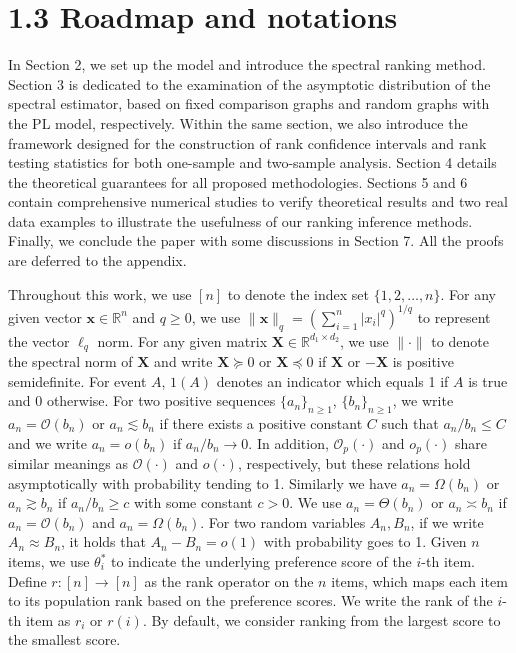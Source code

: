 \section{1.3 Roadmap and notations}\label{roadmap-and-notations}

In Section 2, we set up the model and introduce the spectral ranking method. Section 3 is dedicated to the examination of the asymptotic distribution of the spectral estimator, based on fixed comparison graphs and random graphs with the PL model, respectively. Within the same section, we also introduce the framework designed for the construction of rank confidence intervals and rank testing statistics for both one-sample and two-sample analysis. Section 4 details the theoretical guarantees for all proposed methodologies. Sections 5 and 6 contain comprehensive numerical studies to verify theoretical results and two real data examples to illustrate the usefulness of our ranking inference methods. Finally, we conclude the paper with some discussions in Section 7. All the proofs are deferred to the appendix.

Throughout this work, we use \([n]\) to denote the index set \(\{1,2,\dots ,n\}\). For any given vector \(\mathbf{x} \in \mathbb{R}^n\) and \(q \geq 0\), we use \(\| \mathbf{x}\| _q = (\sum_{i = 1}^{n} |x_i|^q)^{1 / q}\) to represent the vector \(\ell_q\) norm. For any given matrix \(\mathbf{X} \in \mathbb{R}^{d_1 \times d_2}\), we use \(\| \cdot \|\) to denote the spectral norm of \(\mathbf{X}\) and write \(\mathbf{X} \succcurlyeq 0\) or \(\mathbf{X} \preccurlyeq 0\) if \(\mathbf{X}\) or \(- \mathbf{X}\) is positive semidefinite. For event \(A\), \(1(A)\) denotes an indicator which equals 1 if \(A\) is true and 0 otherwise. For two positive sequences \(\{a_n\}_{n \geq 1}\), \(\{b_n\}_{n \geq 1}\), we write \(a_n = \mathcal{O}(b_n)\) or \(a_{n} \lesssim b_{n}\) if there exists a positive constant \(C\) such that \(a_{n} / b_{n} \leq C\) and we write \(a_{n} = o(b_{n})\) if \(a_{n} / b_{n} \to 0\). In addition, \(\mathcal{O}_{p}(\cdot)\) and \(o_{p}(\cdot)\) share similar meanings as \(\mathcal{O}(\cdot)\) and \(o(\cdot)\), respectively, but these relations hold asymptotically with probability tending to 1. Similarly we have \(a_{n} = \Omega (b_{n})\) or \(a_{n} \gtrsim b_{n}\) if \(a_{n} / b_{n} \geq c\) with some constant \(c > 0\). We use \(a_{n} = \Theta (b_{n})\) or \(a_{n} \asymp b_{n}\) if \(a_{n} = \mathcal{O}(b_{n})\) and \(a_{n} = \Omega (b_{n})\). For two random variables \(A_{n}, B_{n}\), if we write \(A_{n} \approx B_{n}\), it holds that \(A_{n} - B_{n} = o(1)\) with probability goes to 1. Given \(n\) items, we use \(\theta_{i}^{*}\) to indicate the underlying preference score of the \(i\)-th item. Define \(r: [n] \to [n]\) as the rank operator on the \(n\) items, which maps each item to its population rank based on the preference scores. We write the rank of the \(i\)-th item as \(r_{i}\) or \(r(i)\). By default, we consider ranking from the largest score to the smallest score.

